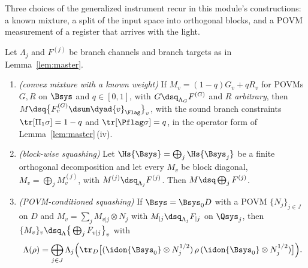 
Three choices of the generalized instrument recur in this module's
constructions: a known mixture, a split of the input space into orthogonal
blocks, and a POVM measurement of a register that arrives with the light.

\begin{corollary}\label{cor:instances}
Let $\Lambda_j$ and $F^{(j)}$ be branch channels and branch targets as in
Lemma~\ref{lem:master}.
\begin{enumerate}[label=(\roman*),leftmargin=3.0em]
\item \emph{(convex mixture with a known weight)} If
  $M_v=(1-q)G_v+qR_v$ for POVMs $G,R$ on $\Bsys$ and $q\in[0,1]$, with
  $G\dsq_{\Lambda_G}F^{(G)}$ and $R$ \emph{arbitrary}, then
  $M\dsq\big\{F^{(G)}_v\dsum\dyad{v}_{\Flag}\big\}_v$, with the sound branch
  constraints $\tr[\Pi_1\sigma]=1-q$ and $\tr[\Pflag\sigma]=q$, in the operator
  form of Lemma~\ref{lem:master}\,(iv).
\item \emph{(block-wise squashing)} Let $\Hs{\Bsys}=\bigoplus_j\Hs{\Bsys_j}$ be
  a finite orthogonal decomposition and let every $M_v$ be block diagonal,
  $M_v=\bigoplus_jM^{(j)}_v$, with $M^{(j)}\dsq_{\Lambda_j}F^{(j)}$. Then
  $M\dsq\bigoplus_jF^{(j)}$.
\item \emph{(POVM-conditioned squashing)} If $\Bsys=\Bsys_0D$ with a POVM
  $\{N_j\}_{j\in J}$ on $D$ and $M_v=\sum_jM_{v|j}\otimes N_j$ with
  $M_{|j}\dsq_{\Lambda_j}F_{|j}$ on $\Qsys_j$, then
  $\{M_v\}_v\dsq_{\Lambda}\big\{\bigoplus_jF_{v|j}\big\}_v$ with
  \begin{equation}\label{eq:povmcond}
    \Lambda(\rho)=\bigoplus_{j\in J}\Lambda_j\Big(
      \tr_{D}\big[(\idon{\Bsys_0}\otimes N_j^{1/2})\,\rho\,
      (\idon{\Bsys_0}\otimes N_j^{1/2})\big]\Big).
  \end{equation}
\end{enumerate}
\end{corollary}

